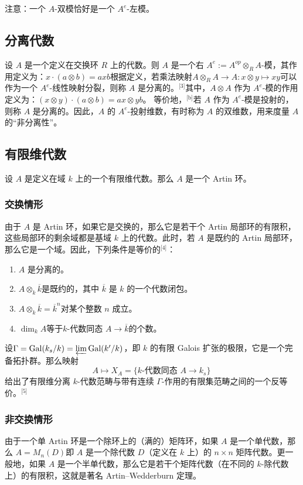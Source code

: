 注意：一个 $A$-双模恰好是一个 $A^e$-左模。
\subsection{分离代数}
设 $A$ 是一个定义在交换环 $R$ 上的代数。则 $A$ 是一个右 $A^e := A^{op} \otimes_R A$-模，其作用定义为：$x \cdot (a \otimes b) = a x b$根据定义，若乘法映射$A \otimes_R A \to A : x \otimes y \mapsto xy$可以作为一个 $A^e$-线性映射分裂，则称 $A$ 是分离的。\(^\text{[3]}\)其中，$A \otimes A$ 作为 $A^e$-模的作用定义为：$(x \otimes y) \cdot (a \otimes b) = a x \otimes y b$。
等价地，\(^\text{[b]}\)若 $A$ 作为 $A^e$-模是投射的，则称 $A$ 是分离的。因此，$A$ 的 $A^e$-投射维数，有时称为 $A$ 的双维数，用来度量 $A$ 的“非分离性”。
\subsection{有限维代数}
设 $A$ 是定义在域 $k$ 上的一个有限维代数。那么 $A$ 是一个 Artin 环。
\subsubsection{交换情形}
由于 $A$ 是 Artin 环，如果它是交换的，那么它是若干个 Artin 局部环的有限积，这些局部环的剩余域都是基域 $k$ 上的代数。此时，若 $A$ 是既约的 Artin 局部环，那么它是一个域。因此，下列条件是等价的\(^\text{[4]}\)：
\begin{enumerate}
\item $A$ 是分离的。
\item $A \otimes_k \overline{k}$是既约的，其中 $\overline{k}$ 是 $k$ 的一个代数闭包。
\item $A \otimes_k \overline{k} = \overline{k}^n$对某个整数 $n$ 成立。
\item $\dim_k A$等于$k\text{-代数同态 } A \to \overline{k}$的个数。
\end{enumerate}
设$\Gamma = \operatorname{Gal}(k_s / k) = \varprojlim \operatorname{Gal}(k'/k)$，即 $k$ 的有限 Galois 扩张的极限，它是一个完备拓扑群。那么映射
$$
A \mapsto X_A = \{k\text{-代数同态 } A \to k_s\}~
$$
给出了有限维分离 $k$-代数范畴与带有连续 $\Gamma$-作用的有限集范畴之间的一个反等价。\(^\text{[5]}\)
\subsubsection{非交换情形}
由于一个单 Artin 环是一个除环上的（满的）矩阵环，如果 $A$ 是一个单代数，那么
$A = M_n(D)$即 $A$ 是一个除代数 $D$（定义在 $k$ 上）的 $n \times n$ 矩阵代数。更一般地，如果 $A$ 是一个半单代数，那么它是若干个矩阵代数（在不同的 $k$-除代数上）的有限积，这就是著名 Artin–Wedderburn 定理。

